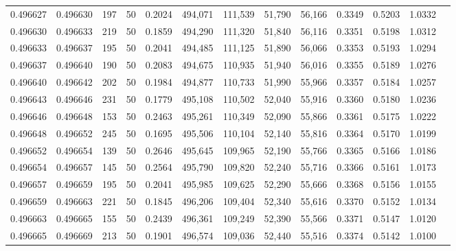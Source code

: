 \begin{tabular}{rrrrrrrrrrrrr}
0.496627 & 0.496630 &   197 &  50 &                                     0.2024 & 494,071 & 111,539 &  51,790 &  56,166 & 0.3349 & 0.5203 & 1.0332 \\
0.496630 & 0.496633 &   219 &  50 &                                     0.1859 & 494,290 & 111,320 &  51,840 &  56,116 & 0.3351 & 0.5198 & 1.0312 \\
0.496633 & 0.496637 &   195 &  50 &                                     0.2041 & 494,485 & 111,125 &  51,890 &  56,066 & 0.3353 & 0.5193 & 1.0294 \\
0.496637 & 0.496640 &   190 &  50 &                                     0.2083 & 494,675 & 110,935 &  51,940 &  56,016 & 0.3355 & 0.5189 & 1.0276 \\
0.496640 & 0.496642 &   202 &  50 &                                     0.1984 & 494,877 & 110,733 &  51,990 &  55,966 & 0.3357 & 0.5184 & 1.0257 \\
0.496643 & 0.496646 &   231 &  50 &                                     0.1779 & 495,108 & 110,502 &  52,040 &  55,916 & 0.3360 & 0.5180 & 1.0236 \\
0.496646 & 0.496648 &   153 &  50 &                                     0.2463 & 495,261 & 110,349 &  52,090 &  55,866 & 0.3361 & 0.5175 & 1.0222 \\
0.496648 & 0.496652 &   245 &  50 &                                     0.1695 & 495,506 & 110,104 &  52,140 &  55,816 & 0.3364 & 0.5170 & 1.0199 \\
0.496652 & 0.496654 &   139 &  50 &                                     0.2646 & 495,645 & 109,965 &  52,190 &  55,766 & 0.3365 & 0.5166 & 1.0186 \\
0.496654 & 0.496657 &   145 &  50 &                                     0.2564 & 495,790 & 109,820 &  52,240 &  55,716 & 0.3366 & 0.5161 & 1.0173 \\
0.496657 & 0.496659 &   195 &  50 &                                     0.2041 & 495,985 & 109,625 &  52,290 &  55,666 & 0.3368 & 0.5156 & 1.0155 \\
0.496659 & 0.496663 &   221 &  50 &                                     0.1845 & 496,206 & 109,404 &  52,340 &  55,616 & 0.3370 & 0.5152 & 1.0134 \\
0.496663 & 0.496665 &   155 &  50 &                                     0.2439 & 496,361 & 109,249 &  52,390 &  55,566 & 0.3371 & 0.5147 & 1.0120 \\
0.496665 & 0.496669 &   213 &  50 &                                     0.1901 & 496,574 & 109,036 &  52,440 &  55,516 & 0.3374 & 0.5142 & 1.0100 \\

\end{tabular}
